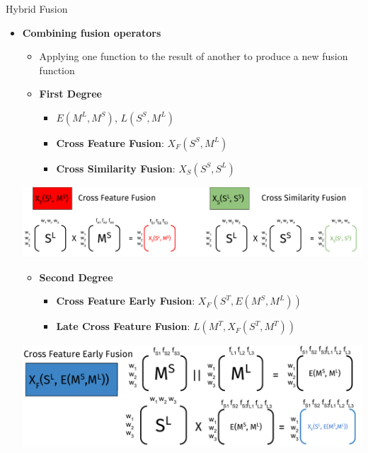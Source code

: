 \documentclass[10pt,=table]{beamer}
\newcommand\mlex{M^{\scriptscriptstyle L}}
\newcommand\msyn{M^{\scriptscriptstyle S}}
\newcommand\ssyn{S^{\scriptscriptstyle S}}
\begin{document}
\begin{frame}{Hybrid Fusion}
\begin{itemize}
\item<1-> \textbf{Combining fusion operators}

\begin{itemize}
\item<1-> Applying one function to the result of another to produce a new fusion function
\end{itemize}
\begin{overprint}
		\begin{itemize}
		\item \textbf{First Degree} 
			\begin{itemize}
			\item $E(\mlex,\msyn)$, $L(\ssyn,\mlex)$ 
			\item \textbf{Cross Feature Fusion}: $X_F(S^S, M^L)$
			\item \textbf{Cross Similarity Fusion}: $X_S(S^S, S^L)$
			\end{itemize}
		\end{itemize}
		\centering
		\includegraphics[width=1\linewidth]{image2/Chapitre2/xFFusion.pdf}
	\onslide<3>
		\begin{itemize}
		\item \textbf{Second Degree} 
			\begin{itemize}
			\item \textbf{Cross Feature Early Fusion}: $X_F(S^T , E(M^S, M^L ))$
			\item \textbf{Late Cross Feature Fusion}: $L(M^T, X_F (S^T , M^T ))$
			\end{itemize}
		\end{itemize}
		\centering
		\includegraphics[width=1\linewidth]{image2/Chapitre2/XFEF.pdf}


\end{overprint}
\end{itemize}
\end{frame}
\end{document}
